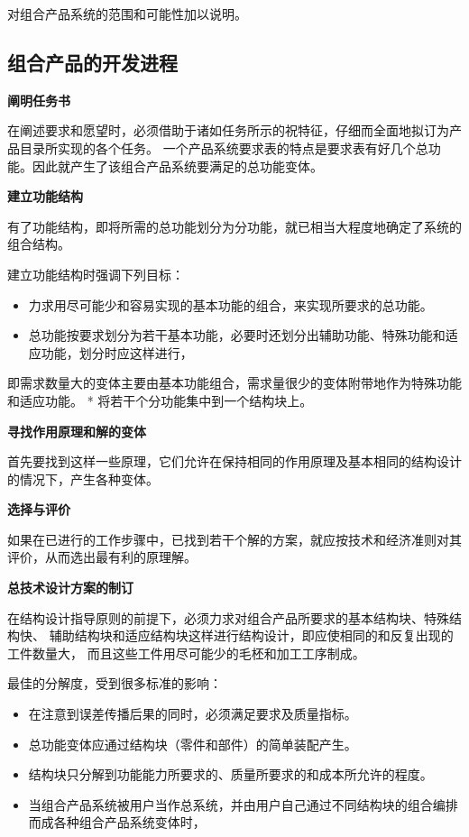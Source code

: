 \documentclass[letterpaper,10pt,english]{sphinxmanual}
\begin{document}
对组合产品系统的范围和可能性加以说明。


\subsection{组合产品的开发进程}
\label{unit7:id11}
\textbf{阐明任务书}

在阐述要求和愿望时，必须借助于诸如任务所示的祝特征，仔细而全面地拟订为产品目录所实现的各个任务。
一个产品系统要求表的特点是要求表有好几个总功能。因此就产生了该组合产品系统要满足的总功能变体。

\textbf{建立功能结构}

有了功能结构，即将所需的总功能划分为分功能，就已相当大程度地确定了系统的组合结构。

建立功能结构时强调下列目标：
\begin{itemize}
\item {} 
力求用尽可能少和容易实现的基本功能的组合，来实现所要求的总功能。

\item {} 
总功能按要求划分为若干基本功能，必要时还划分出辅助功能、特殊功能和适应功能，划分时应这样进行，

\end{itemize}

即需求数量大的变体主要由基本功能组合，需求量很少的变体附带地作为特殊功能和适应功能。
* 将若干个分功能集中到一个结构块上。

\textbf{寻找作用原理和解的变体}

首先要找到这样一些原理，它们允许在保持相同的作用原理及基本相同的结构设计的情况下，产生各种变体。

\textbf{选择与评价}

如果在已进行的工作步骤中，已找到若干个解的方案，就应按技术和经济准则对其评价，从而选出最有利的原理解。

\textbf{总技术设计方案的制订}

在结构设计指导原则的前提下，必须力求对组合产品所要求的基本结构块、特殊结构快、
辅助结构块和适应结构块这样进行结构设计，即应使相同的和反复出现的工件数量大，
而且这些工件用尽可能少的毛柸和加工工序制成。

最佳的分解度，受到很多标准的影响：
\begin{itemize}
\item {} 
在注意到误差传播后果的同时，必须满足要求及质量指标。

\item {} 
总功能变体应通过结构块（零件和部件）的简单装配产生。

\item {} 
结构块只分解到功能能力所要求的、质量所要求的和成本所允许的程度。

\item {} 
当组合产品系统被用户当作总系统，并由用户自己通过不同结构块的组合编排而成各种组合产品系统变体时，

\end{itemize}
\end{document}
